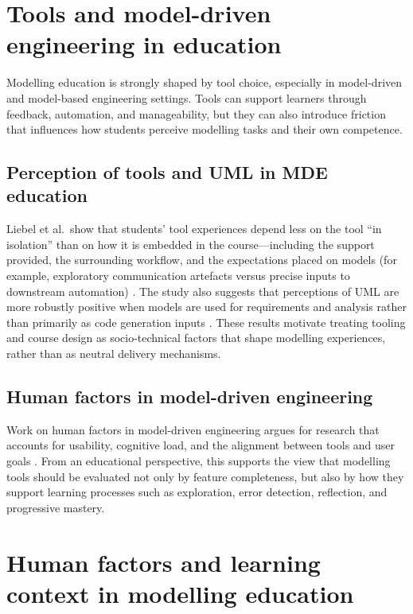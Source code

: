 \section{Tools and model-driven engineering in education}
\label{sec:rw_tools_mde}

Modelling education is strongly shaped by tool choice, especially in model-driven and model-based engineering settings. Tools can support learners through feedback, automation, and manageability, but they can also introduce friction that influences how students perceive modelling tasks and their own competence.

\subsection{Perception of tools and UML in MDE education}
\label{subsec:rw_liebel_tools_uml}

Liebel et al.\ show that students’ tool experiences depend less on the tool “in isolation” than on how it is embedded in the course---including the support provided, the surrounding workflow, and the expectations placed on models (for example, exploratory communication artefacts versus precise inputs to downstream automation) \cite{liebel2017model}. The study also suggests that perceptions of UML are more robustly positive when models are used for requirements and analysis rather than primarily as code generation inputs \cite{liebel2017model}. These results motivate treating tooling and course design as socio-technical factors that shape modelling experiences, rather than as neutral delivery mechanisms.

\subsection{Human factors in model-driven engineering}
\label{subsec:rw_hf_mde}

Work on human factors in model-driven engineering argues for research that accounts for usability, cognitive load, and the alignment between tools and user goals \cite{human-factors-mde}. From an educational perspective, this supports the view that modelling tools should be evaluated not only by feature completeness, but also by how they support learning processes such as exploration, error detection, reflection, and progressive mastery.

\section{Human factors and learning context in modelling education}
\label{sec:rw_human_context}

